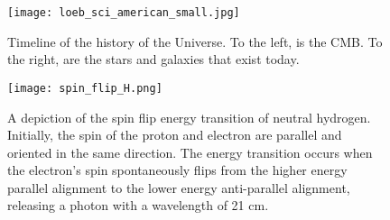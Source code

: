 

\begin{figure}[th]
	\centering
	\texttt{[image: loeb\_sci\_american\_small.jpg]}
	\caption[Epoch of Reionization Timeline]{Timeline of the history of the Universe. To the left, is the CMB. To the right, are the stars and galaxies that exist today.}
	\label{fig:timeline}
\end{figure}

\begin{figure}[th]
	\centering
	\texttt{[image: spin\_flip\_H.png]}
	\caption[Spin-Flip Transition]{A depiction of the spin flip energy transition of neutral hydrogen. Initially,
																					 the spin of the proton and electron are parallel and oriented
																					 in the same direction. The energy transition occurs when the electron's spin spontaneously
																					 flips from the higher energy parallel alignment to the lower energy anti-parallel alignment,
																					 releasing a photon with a wavelength of 21 cm.}
	\label{fig:spin_flip}
\end{figure}
